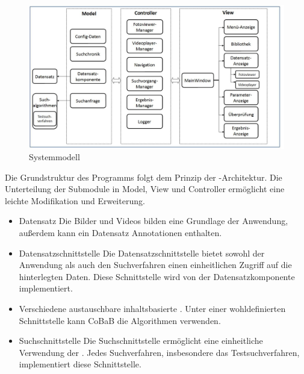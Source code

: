 \begin{figure}[h]
\includegraphics[width=1\linewidth]{img/sysmodell}
\caption{Systemmodell}
\label{fig:systemmodell}
\end{figure}
\vspace{10pt}

Die Grundstruktur des Programms folgt dem Prinzip der -Architektur. Die Unterteilung der Submodule in Model, View und Controller ermöglicht eine leichte Modifikation und Erweiterung.

\begin{itemize}
\item Datensatz\newline
Die Bilder und Videos bilden eine Grundlage der Anwendung, außerdem kann ein Datensatz  {Annotationen} enthalten.
\item Datensatzschnittstelle\newline
Die Datensatzschnittstelle bietet sowohl der Anwendung als auch den \gls{Suchverfahren} einen einheitlichen Zugriff auf die hinterlegten Daten. Diese Schnittstelle wird von der Datensatzkomponente implementiert.
\item {}\newline
Verschiedene austauschbare inhaltsbasierte . Unter einer wohldefinierten Schnittstelle kann CoBaB die Algorithmen verwenden.
\item Suchschnittstelle\newline
Die Suchschnittstelle ermöglicht eine einheitliche Verwendung der . Jedes \gls{Suchverfahren}, insbesondere das Testsuchverfahren, implementiert diese Schnittstelle.
\end{itemize}

